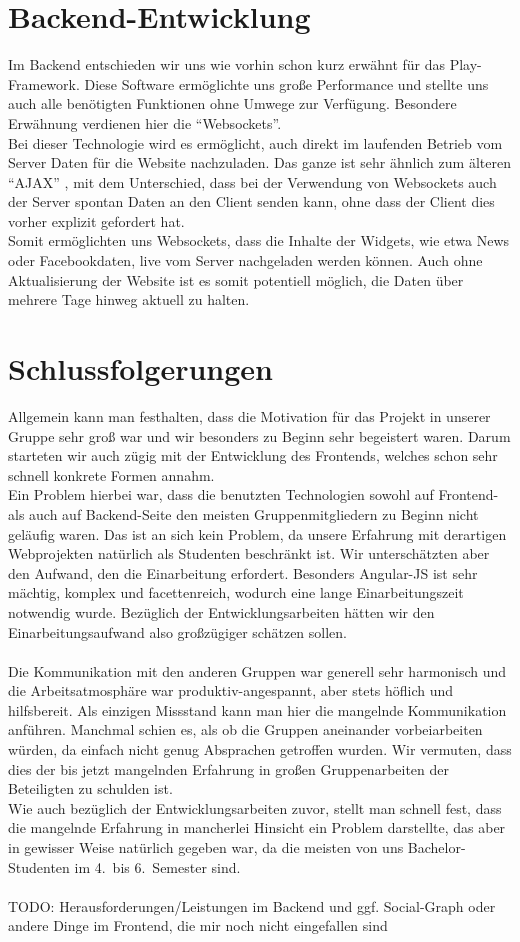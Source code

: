 \documentclass[10pt,a4paper]{report}
\begin{document}
\section{Backend-Entwicklung}
	Im Backend entschieden wir uns wie vorhin schon kurz erwähnt für das Play-Framework. Diese Software ermöglichte uns große Performance und stellte uns auch alle benötigten Funktionen ohne Umwege zur Verfügung. Besondere Erwähnung verdienen hier die "`Websockets"'.\\
	Bei dieser Technologie wird es ermöglicht, auch direkt im laufenden Betrieb vom Server Daten für die Website nachzuladen. Das ganze ist sehr ähnlich zum älteren "`AJAX"' , mit dem Unterschied, dass bei der Verwendung von Websockets auch der Server spontan Daten an den Client senden kann, ohne dass der Client dies vorher explizit gefordert hat.\\
	Somit ermöglichten uns Websockets, dass die Inhalte der Widgets, wie etwa News oder Facebookdaten, live vom Server nachgeladen werden können. Auch ohne Aktualisierung der Website ist es somit potentiell möglich, die Daten über mehrere Tage hinweg aktuell zu halten.

\section{Schlussfolgerungen}
Allgemein kann man festhalten, dass die Motivation für das Projekt in unserer Gruppe sehr groß war und wir besonders zu Beginn sehr begeistert waren. Darum starteten wir auch zügig mit der Entwicklung des Frontends, welches schon sehr schnell konkrete Formen annahm.\\
Ein Problem hierbei war, dass die benutzten Technologien sowohl auf Frontend- als auch auf Backend-Seite den meisten Gruppenmitgliedern zu Beginn nicht geläufig waren. Das ist an sich kein Problem, da unsere Erfahrung mit derartigen Webprojekten natürlich als Studenten beschränkt ist. Wir unterschätzten aber den Aufwand, den die Einarbeitung erfordert. Besonders Angular-JS ist sehr mächtig, komplex und facettenreich, wodurch eine lange Einarbeitungszeit notwendig wurde. Bezüglich der Entwicklungsarbeiten hätten wir den Einarbeitungsaufwand also großzügiger schätzen sollen.\\\\
Die Kommunikation mit den anderen Gruppen war generell sehr harmonisch und die Arbeitsatmosphäre war produktiv-angespannt, aber stets höflich und hilfsbereit. Als einzigen Missstand kann man hier die mangelnde Kommunikation anführen. Manchmal schien es, als ob die Gruppen aneinander vorbeiarbeiten würden, da einfach nicht genug Absprachen getroffen wurden. Wir vermuten, dass dies der bis jetzt mangelnden Erfahrung in großen Gruppenarbeiten der Beteiligten zu schulden ist.\\
Wie auch bezüglich der Entwicklungsarbeiten zuvor, stellt man schnell fest, dass die mangelnde Erfahrung in mancherlei Hinsicht ein Problem darstellte, das aber in gewisser Weise natürlich gegeben war, da die meisten von uns Bachelor-Studenten im 4.~bis 6.~Semester sind.\\\\

	TODO: Herausforderungen/Leistungen im Backend und ggf. Social-Graph oder andere Dinge im Frontend, die mir noch nicht eingefallen sind
\end{document}
